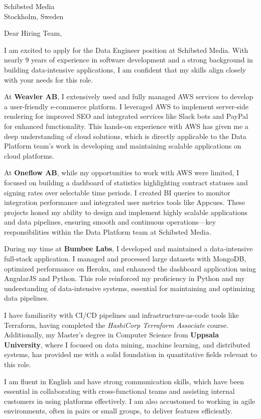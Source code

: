 \documentclass{letter}
\begin{document}
\begin{letter}{Schibsted Media\\
Stockholm, Sweden}

\opening{Dear Hiring Team,}

I am excited to apply for the Data Engineer position at Schibsted Media. With nearly 9 years of experience in software development and a strong background in building data-intensive applications, I am confident that my skills align closely with your needs for this role.

At \textbf{Weavler AB}, I extensively used and fully managed AWS services to develop a user-friendly e-commerce platform. I leveraged AWS to implement server-side rendering for improved SEO and integrated services like Slack bots and PayPal for enhanced functionality. This hands-on experience with AWS has given me a deep understanding of cloud solutions, which is directly applicable to the Data Platform team's work in developing and maintaining scalable applications on cloud platforms.

At \textbf{Oneflow AB}, while my opportunities to work with AWS were limited, I focused on building a dashboard of statistics highlighting contract statuses and signing rates over selectable time periods. I created BI queries to monitor integration performance and integrated user metrics tools like Appcues. These projects honed my ability to design and implement highly scalable applications and data pipelines, ensuring smooth and continuous operations—key responsibilities within the Data Platform team at Schibsted Media.

During my time at \textbf{Bumbee Labs}, I developed and maintained a data-intensive full-stack application. I managed and processed large datasets with MongoDB, optimized performance on Heroku, and enhanced the dashboard application using AngularJS and Python. This role reinforced my proficiency in Python and my understanding of data-intensive systems, essential for maintaining and optimizing data pipelines.

I have familiarity with CI/CD pipelines and infrastructure-as-code tools like Terraform, having completed the \textit{HashiCorp Terraform Associate} course. Additionally, my Master's degree in Computer Science from \textbf{Uppsala University}, where I focused on data mining, machine learning, and distributed systems, has provided me with a solid foundation in quantitative fields relevant to this role.

I am fluent in English and have strong communication skills, which have been essential in collaborating with cross-functional teams and assisting internal customers in using platforms effectively. I am also accustomed to working in agile environments, often in pairs or small groups, to deliver features efficiently.


\end{letter}
\end{document}
